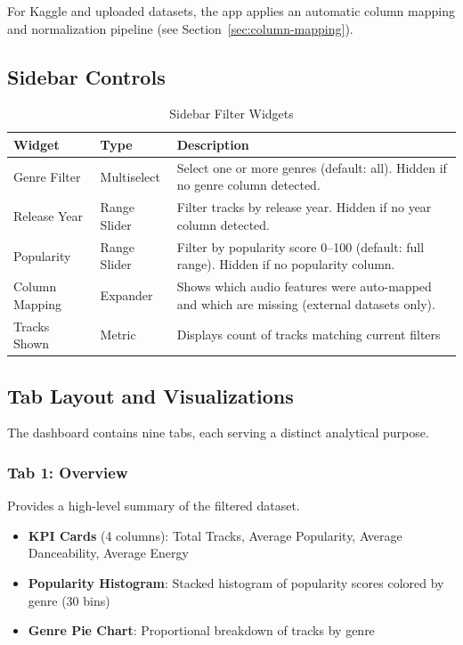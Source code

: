 \documentclass[12pt,a4paper]{article}
\begin{document}
For Kaggle and uploaded datasets, the app applies an automatic column mapping and normalization pipeline (see Section~\ref{sec:column-mapping}).

\subsection{Sidebar Controls}

\begin{table}[H]
\centering
\caption{Sidebar Filter Widgets}
\begin{tabular}{@{}llp{5.5cm}@{}}
\toprule
\textbf{Widget} & \textbf{Type} & \textbf{Description} \\
\midrule
Genre Filter     & Multiselect & Select one or more genres (default: all). Hidden if no genre column detected. \\
Release Year     & Range Slider & Filter tracks by release year. Hidden if no year column detected. \\
Popularity       & Range Slider & Filter by popularity score 0--100 (default: full range). Hidden if no popularity column. \\
Column Mapping   & Expander & Shows which audio features were auto-mapped and which are missing (external datasets only). \\
Tracks Shown     & Metric & Displays count of tracks matching current filters \\
\bottomrule
\end{tabular}
\end{table}

\subsection{Tab Layout and Visualizations}

The dashboard contains nine tabs, each serving a distinct analytical purpose.

\subsubsection{Tab 1: Overview}

Provides a high-level summary of the filtered dataset.

\begin{itemize}[noitemsep]
    \item \textbf{KPI Cards} (4 columns): Total Tracks, Average Popularity, Average Danceability, Average Energy
    \item \textbf{Popularity Histogram}: Stacked histogram of popularity scores colored by genre (30 bins)
    \item \textbf{Genre Pie Chart}: Proportional breakdown of tracks by genre
\end{itemize}
\end{document}
